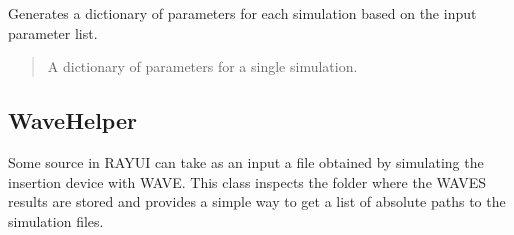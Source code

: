\documentclass[letterpaper,10pt,english]{sphinxmanual}
\begin{document}
\begin{fulllineitems}
\begin{fulllineitems}
\begin{quote}
\begin{description}
\end{description}\end{quote}

\end{fulllineitems}


\begin{fulllineitems}
\label{\detokenize{API:raypyng.simulate.SimulationParams.simulation_parameters_generator}}
\pysigstartsignatures
\pysiglinewithargsret
{}
{}
{}
\pysigstopsignatures
\sphinxAtStartPar
Generates a dictionary of parameters for each simulation
based on the input parameter list.
\begin{quote}\begin{description}
\sphinxAtStartPar
{} \textendash{} A dictionary of parameters for a single simulation.

\end{description}\end{quote}

\end{fulllineitems}


\end{fulllineitems}



\subsection{WaveHelper}
\label{\detokenize{API:wavehelper}}
\sphinxAtStartPar
Some source in RAY\sphinxhyphen{}UI can take as an input a file obtained by simulating the
insertion device with WAVE. This class inspects the folder where the WAVES results are
stored and provides a simple way to get a list of absolute paths to the simulation files.
\end{document}
